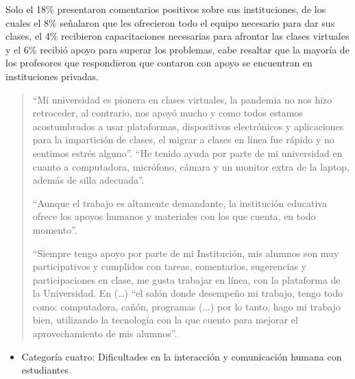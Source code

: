\documentclass[spanish]{textolivre}
\begin{document}
Solo el 18\% presentaron comentarios positivos sobre sus instituciones, de los cuales el 8\% señalaron que les ofrecieron todo el equipo necesario para dar sus clases, el 4\% recibieron capacitaciones necesarias para afrontar las clases virtuales y el 6\% recibió apoyo para superar los problemas, cabe resaltar que la mayoría de los profesores que respondieron que contaron con apoyo se encuentran en instituciones privadas.
\begin{quote}
 “Mi universidad es pionera en clases virtuales, la pandemia no nos hizo retroceder, al contrario, nos apoyó mucho y como todos estamos acostumbrados a usar plataformas, dispositivos electrónicos y aplicaciones para la impartición de clases, el migrar a clases en línea fue rápido y no sentimos estrés alguno”. “He tenido ayuda por parte de mi universidad en cuanto a computadora, micrófono, cámara y un monitor extra de la laptop, además de silla adecuada”.

 “Aunque el trabajo es altamente demandante, la institución educativa ofrece los apoyos humanos y materiales con los que cuenta, en todo momento”.

 “Siempre tengo apoyo por parte de mi Institución, mis alumnos son muy participativos y cumplidos con tareas, comentarios, sugerencias y participaciones en clase, me gusta trabajar en línea, con la plataforma de la Universidad. En (…) “el salón donde desempeño mi trabajo, tengo todo como: computadora, cañón, programas (...) por lo tanto, hago mi trabajo bien, utilizando la tecnología con la que cuento para mejorar el aprovechamiento de mis alumnos”.
\end{quote}

\begin{itemize}
 \item Categoría cuatro: Dificultades en la interacción y comunicación humana con estudiantes
\end{itemize}
\end{document}
